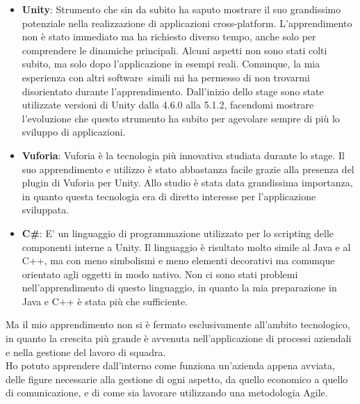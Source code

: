 \begin{itemize}
	\item \textbf{Unity}: Strumento che sin da subito ha saputo mostrare il suo grandissimo potenziale nella realizzazione di applicazioni cross-platform\gloss. L'apprendimento non \`e stato immediato ma ha richiesto diverso tempo, anche solo per comprendere le dinamiche principali. Alcuni aspetti non sono stati colti subito, ma solo dopo l'applicazione in esempi reali. Comunque, la mia esperienza con altri software\gloss\ simili mi ha permesso di non trovarmi disorientato durante l'apprendimento. Dall'inizio dello stage sono state utilizzate versioni di Unity dalla 4.6.0 alla 5.1.2, facendomi mostrare l'evoluzione che questo strumento ha subito per agevolare sempre di pi\`u lo sviluppo di applicazioni.
	\item \textbf{Vuforia}: Vuforia \`e la tecnologia pi\`u innovativa studiata durante lo stage. Il suo apprendimento e utilizzo \`e stato abbastanza facile grazie alla presenza del plugin di Vuforia per Unity. Allo studio \`e stata data grandissima importanza, in quanto questa tecnologia era di diretto interesse per l'applicazione sviluppata.
	\item \textbf{C\#}: E' un linguaggio di programmazione utilizzato per lo scripting delle componenti interne a Unity. Il linguaggio \`e risultato molto simile al Java e al C++, ma con meno simbolismi e meno elementi decorativi ma comunque orientato agli oggetti in modo nativo. Non ci sono stati problemi nell'apprendimento di questo linguaggio, in quanto la mia preparazione in Java e C++ \`e stata pi\`u che sufficiente.
\end{itemize}

Ma il mio apprendimento non si \`e fermato esclusivamente all'ambito tecnologico, in quanto la crescita pi\`u grande \`e avvenuta nell'applicazione di processi aziendali e nella gestione del lavoro di squadra.\\
Ho potuto apprendere dall'interno come funziona un'azienda appena avviata, delle figure necessarie alla gestione di ogni aspetto, da quello economico a quello di comunicazione, e di come sia lavorare utilizzando una metodologia Agile.


